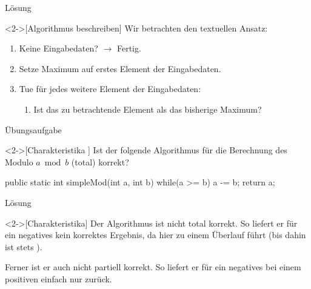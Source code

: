 \begin{frame}[c]{Lösung}
    \begin{solve}<2->[Algorithmus beschreiben]
        \pause{}Wir betrachten den textuellen Ansatz: \begin{enumerate}[<+(1)->]
            \item Keine Eingabedaten? \(\to\) Fertig.
            \item Setze Maximum auf erstes Element der Eingabedaten.
            \item Tue für jedes weitere Element der Eingabedaten: \begin{enumerate}
                \item Ist das zu betrachtende Element  als das bisherige Maximum? 
            \end{enumerate}
        \end{enumerate}
    \end{solve}
\end{frame}

\begin{frame}[c,fragile]{Übungsaufgabe}
    \begin{exercise}<2->[Charakteristika ]
        Ist der folgende Algorithmus für die Berechnung des Modulo \(a \bmod b\) (total) korrekt?\pause{}
        \begin{plainjava}
public static int simpleMod(int a, int b){
    while(a >= b)
        a -= b;
    return a;
}
        \end{plainjava}
    \end{exercise}
\end{frame}

\begin{frame}[c]{Lösung}
    \begin{solve}<2->[Charakteristika]
       \pause{}Der Algorithmus ist nicht total korrekt.\pause{} So liefert er für ein negatives  kein korrektes Ergebnis,\pause{} da hier  zu einem Überlauf führt (bis dahin ist stets ).\medskip\par
       \pause{}Ferner ist er auch nicht partiell korrekt.\pause{} So liefert er für ein negatives  bei einem positiven  einfach nur  zurück.
    \end{solve}
\end{frame}

